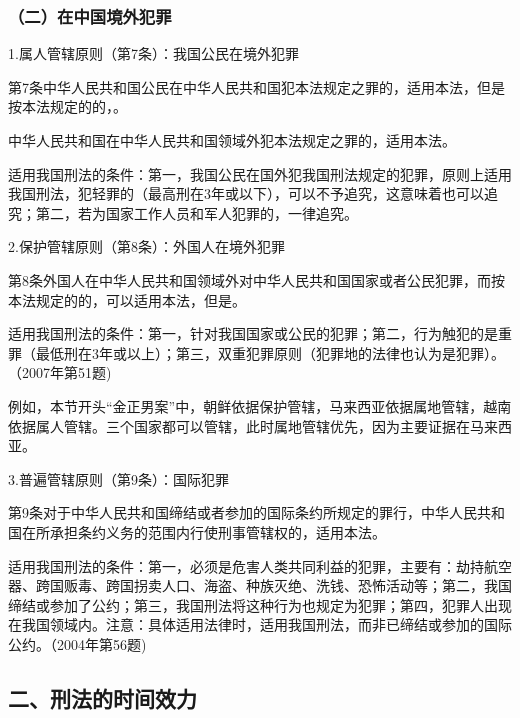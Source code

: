 \subsubsection*{（二）在中国境外犯罪}

1.属人管辖原则（第7条）：我国公民在境外犯罪

第7条中华人民共和国公民在中华人民共和国犯本法规定之罪的，适用本法，但是按本法规定的的，。

中华人民共和国在中华人民共和国领域外犯本法规定之罪的，适用本法。

适用我国刑法的条件：第一，我国公民在国外犯我国刑法规定的犯罪，原则上适用我国刑法，犯轻罪的（最高刑在3年或以下），可以不予追究，这意味着也可以追究；第二，若为国家工作人员和军人犯罪的，一律追究。

2.保护管辖原则（第8条）：外国人在境外犯罪

第8条外国人在中华人民共和国领域外对中华人民共和国国家或者公民犯罪，而按本法规定的的，可以适用本法，但是。

适用我国刑法的条件：第一，针对我国国家或公民的犯罪；第二，行为触犯的是重罪（最低刑在3年或以上）；第三，双重犯罪原则（犯罪地的法律也认为是犯罪）。（2007年第51题)

例如，本节开头“金正男案”中，朝鲜依据保护管辖，马来西亚依据属地管辖，越南依据属人管辖。三个国家都可以管辖，此时属地管辖优先，因为主要证据在马来西亚。

3.普遍管辖原则（第9条）：国际犯罪

第9条对于中华人民共和国缔结或者参加的国际条约所规定的罪行，中华人民共和国在所承担条约义务的范围内行使刑事管辖权的，适用本法。

适用我国刑法的条件：第一，必须是危害人类共同利益的犯罪，主要有：劫持航空器、跨国贩毒、跨国拐卖人口、海盗、种族灭绝、洗钱、恐怖活动等；第二，我国缔结或参加了公约；第三，我国刑法将这种行为也规定为犯罪；第四，犯罪人出现在我国领域内。注意：具体适用法律时，适用我国刑法，而非已缔结或参加的国际公约。（2004年第56题)


\subsection*{二、刑法的时间效力}

